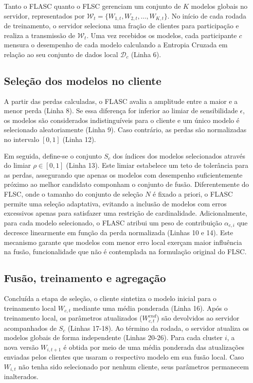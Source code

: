 Tanto o FLASC quanto o FLSC gerenciam um conjunto de $K$ modelos globais no servidor,
representados por $\mathcal{W}_t = \{W_{1,t}, W_{2,t}, \dots, W_{K,t}\}$.
No início de cada rodada de treinamento, o servidor seleciona uma fração de clientes para participação e realiza a transmissão de $\mathcal{W}_t$.
Uma vez recebidos os modelos, cada  participante $c$ mensura o desempenho de cada modelo
calculando a Entropia Cruzada em relação ao seu conjunto de dados local $\mathcal{D}_c$ (Linha 6).

\subsection{Seleção dos modelos no cliente}

A partir das perdas calculadas, o FLASC avalia a amplitude entre a maior e a menor perda (Linha 8).
Se essa diferença for inferior ao limiar de sensibilidade $\epsilon$,
os modelos são considerados indistinguíveis para o cliente e um único modelo é selecionado aleatoriamente (Linha 9).
Caso contrário, as perdas são normalizadas no intervalo $[0, 1]$ (Linha 12).

Em seguida, define-se o conjunto $S_{c}$ dos índices dos modelos selecionados através do limiar $\rho \in [0, 1]$ (Linha 13).
Este limiar estabelece um teto de tolerância para as perdas,
assegurando que apenas os modelos com desempenho suficientemente próximo ao melhor candidato componham o conjunto de fusão.
Diferentemente do FLSC, onde o tamanho do conjunto de seleção $N$ é fixado a priori,
o FLASC permite uma seleção adaptativa, evitando a inclusão de modelos com erros excessivos apenas para satisfazer uma restrição de cardinalidade.
Adicionalmente, para cada modelo selecionado, o FLASC atribui um peso de contribuição $\alpha_{c,i}$ que decresce linearmente em função da perda normalizada (Linhas 10 e 14).
Este mecanismo garante que modelos com menor erro local exerçam maior influência na fusão, funcionalidade que não é contemplada na formulação original do FLSC.

\subsection{Fusão, treinamento e agregação}

Concluída a etapa de seleção, o cliente sintetiza o modelo inicial para o treinamento local
$W_{c,t}$ mediante uma média ponderada (Linha 16).
Após o treinamento local, os parâmetros atualizados ($W_{c,t}^{end}$) são devolvidos ao servidor acompanhados de $S_c$ (Linhas 17-18).
Ao término da rodada, o servidor atualiza os modelos globais de forma independente (Linhas 20-26).
Para cada cluster $i$, a nova versão $W_{i,t+1}$ é obtida por meio de uma média ponderada
das atualizações enviadas pelos clientes que usaram o respectivo modelo em sua fusão local.
Caso $W_{i,t}$ não tenha sido selecionado por nenhum cliente, seus parâmetros permanecem inalterados.
